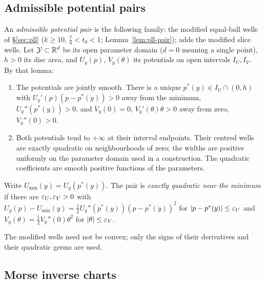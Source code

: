 \subsection{Admissible potential pairs}\label{sec:pln-pairs}

\begin{definition}\label{def:pln-potential-pair}
An \emph{admissible potential pair} is the following family: the modified equal-ball wells of
\S\ref{sec:pll} ($k\ge10$, $\frac78<t_0<1$; Lemma~\ref{lem:pll-pair}); \cite{SongHD} adds the modified slice wells. Let $\mathcal Y\subset\mathbb{R}^d$ be its open parameter domain ($d=0$ meaning a single point), $h>0$ its
disc area, and $U_y(p)$, $V_y(\theta)$ its potentials on open intervals $I_U,I_V$. By that lemma:
\begin{enumerate}[label=(P\arabic*)]
\item\label{it:pln-P1} The potentials are jointly smooth. There is a unique
$p^*(y)\in I_U\cap(0,h)$ with $U_y'(p)(p-p^*(y))>0$ away from the minimum,
$U_y''(p^*(y))>0$, and $V_y(0)=0$, $V_y'(\theta)\theta>0$ away from zero,
$V_y''(0)>0$.
\item\label{it:pln-P2} Both potentials tend to $+\infty$ at their interval
endpoints. Their centred wells are exactly quadratic on neighbourhoods of zero;
the widths are positive uniformly on the parameter domain used in a construction.
The quadratic coefficients are smooth positive functions of the parameters.
\end{enumerate}
Write $U_{\min}(y)=U_y(p^*(y))$. The pair is \emph{exactly quadratic near the minimum} if there are
$\varepsilon_U,\varepsilon_V>0$ with $U_y(p)-U_{\min}(y)=\frac12U_y''(p^*(y))(p-p^*(y))^2$ for $|p-p^*(y)|\le\varepsilon_U$ and
$V_y(\theta)=\frac12V_y''(0)\theta^2$ for $|\theta|\le\varepsilon_V$.
\end{definition}

The modified wells need not be convex; only the signs of their derivatives and their quadratic germs are used.

\subsection{Morse inverse charts}\label{sec:pln-morse}

